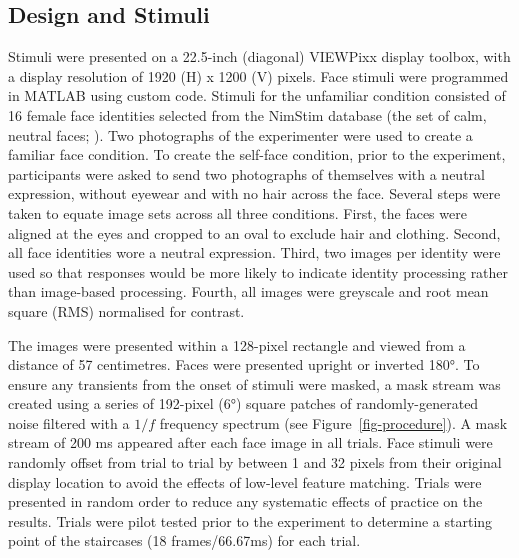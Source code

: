 \documentclass[
  authoryear,
  review,
  3p,
  onecolumn]{elsarticle}
\begin{document}
\subsection{Design and Stimuli}\label{design-and-stimuli}

Stimuli were presented on a 22.5-inch (diagonal) VIEWPixx display
toolbox, with a display resolution of 1920 (H) x 1200 (V) pixels. Face
stimuli were programmed in MATLAB using custom code. Stimuli for the
unfamiliar condition consisted of 16 female face identities selected
from the NimStim database (the set of calm, neutral faces;
\citet{tottenham2009a}). Two photographs of the experimenter were used
to create a familiar face condition. To create the self-face condition,
prior to the experiment, participants were asked to send two photographs
of themselves with a neutral expression, without eyewear and with no
hair across the face. Several steps were taken to equate image sets
across all three conditions. First, the faces were aligned at the eyes
and cropped to an oval to exclude hair and clothing. Second, all face
identities wore a neutral expression. Third, two images per identity
were used so that responses would be more likely to indicate identity
processing rather than image-based processing. Fourth, all images were
greyscale and root mean square (RMS) normalised for contrast.

The images were presented within a 128-pixel rectangle and viewed from a
distance of 57 centimetres. Faces were presented upright or inverted
180°. To ensure any transients from the onset of stimuli were masked, a
mask stream was created using a series of 192-pixel (6°) square patches
of randomly-generated noise filtered with a \(1/f\) frequency spectrum
(see Figure~\ref{fig-procedure}). A mask stream of 200 ms appeared after
each face image in all trials. Face stimuli were randomly offset from
trial to trial by between 1 and 32 pixels from their original display
location to avoid the effects of low-level feature matching. Trials were
presented in random order to reduce any systematic effects of practice
on the results. Trials were pilot tested prior to the experiment to
determine a starting point of the staircases (18 frames/66.67ms) for
each trial.
\end{document}
